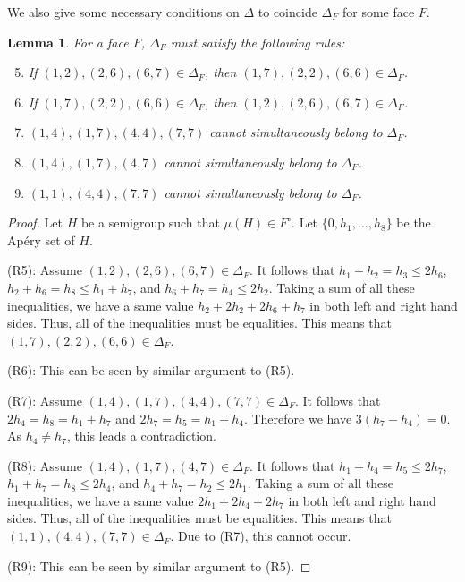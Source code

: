 \documentclass{amsart}
\theoremstyle{plain}
\newtheorem{lemma}[theorem]{Lemma}
\theoremstyle{definition}
\numberwithin{theorem}{section}
\numberwithin{equation}{section}
\numberwithin{equation}{theorem}
\begin{document}
We also give some necessary conditions on $\Delta$ to coincide $\Delta_F$ for some face $F$.

\begin{lemma}\label{lemmafaces}
For a face $F$, $\Delta_F$ must satisfy the following rules:
\begin{enumerate}[ \rm(R1)]
\setcounter{enumi}{4}

\item If $(1,2), (2,6), (6,7) \in \Delta_F$, then $(1,7), (2,2), (6,6) \in \Delta_F$.

\item If $(1,7), (2,2), (6,6) \in \Delta_F$, then $(1,2), (2,6), (6,7) \in \Delta_F$.

\item $(1,4),(1,7),(4,4),(7,7)$ cannot simultaneously belong to $\Delta_F$.

\item $(1,4), (1,7), (4,7)$ cannot simultaneously belong to $\Delta_F$.

\item $(1,1), (4,4), (7,7)$ cannot simultaneously belong to $\Delta_F$.

\end{enumerate}
\end{lemma}

\begin{proof}
Let $H$ be a semigroup such that $\mu(H)\in F^{\circ}$.
Let $\{0,h_1,\dots,h_8\}$ be the Ap\'ery set of $H$.

(R5): Assume $(1,2),(2,6),(6,7)\in \Delta_F$.
It follows that $h_1+h_2=h_3 \le 2h_6$, $h_2+h_6=h_8 \le h_1+h_7$, and $h_6+h_7=h_4 \le 2h_2$.
Taking a sum of all these inequalities, we have a same value $h_2+2h_2+2h_6+h_7$ in both left and right hand sides.
Thus, all of the inequalities must be equalities.
This means that $(1,7),(2,2),(6,6)\in \Delta_F$.

(R6): This can be seen by similar argument to (R5).

(R7): Assume $(1,4),(1,7),(4,4),(7,7) \in \Delta_F$.
It follows that $2h_4=h_8=h_1+h_7$ and $2h_7=h_5=h_1+h_4$.
Therefore we have $3(h_7-h_4)=0$.
As $h_4\not=h_7$, this leads a contradiction.

(R8): Assume $(1,4),(1,7),(4,7)\in \Delta_F$.
It follows that $h_1+h_4=h_5 \le 2h_7$, $h_1+h_7=h_8 \le 2h_4$, and $h_4+h_7=h_2 \le 2h_1$.
Taking a sum of all these inequalities, we have a same value $2h_1+2h_4+2h_7$ in both left and right hand sides.
Thus, all of the inequalities must be equalities.
This means that $(1,1),(4,4),(7,7)\in \Delta_F$.
Due to (R7), this cannot occur.

(R9): This can be seen by similar argument to (R5).
\end{proof}
\end{document}
